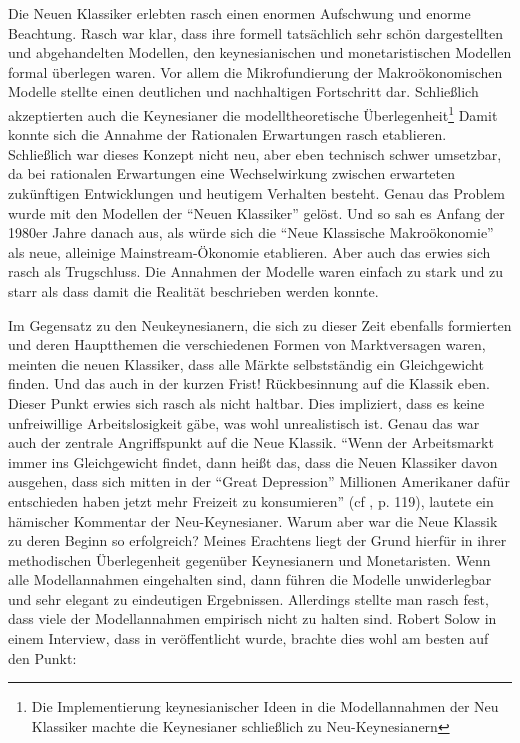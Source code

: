 Die Neuen Klassiker erlebten rasch einen enormen Aufschwung und enorme Beachtung. Rasch war klar, dass ihre formell tatsächlich sehr schön dargestellten und abgehandelten Modellen, den keynesianischen und monetaristischen Modellen formal überlegen waren.
Vor allem die Mikrofundierung der Makroökonomischen Modelle stellte einen deutlichen und nachhaltigen Fortschritt dar. Schließlich akzeptierten auch die Keynesianer die modelltheoretische Überlegenheit\footnote{Die Implementierung keynesianischer Ideen in die Modellannahmen der Neu Klassiker machte die Keynesianer schließlich zu Neu-Keynesianern}
Damit konnte sich die Annahme der Rationalen Erwartungen rasch etablieren. Schließlich war dieses Konzept nicht neu, aber eben technisch schwer umsetzbar, da bei rationalen Erwartungen eine Wechselwirkung zwischen erwarteten zukünftigen Entwicklungen und heutigem Verhalten besteht. Genau das Problem wurde mit den Modellen der "`Neuen Klassiker"' gelöst. Und so sah es Anfang der 1980er Jahre danach aus, als würde sich die "`Neue Klassische Makroökonomie"' als neue, alleinige Mainstream-Ökonomie etablieren. Aber auch das erwies sich rasch als Trugschluss. Die Annahmen der Modelle waren einfach zu stark und zu starr als dass damit die Realität beschrieben werden konnte. 
		
Im Gegensatz zu den Neukeynesianern, die sich zu dieser Zeit ebenfalls formierten und deren Hauptthemen die verschiedenen Formen von Marktversagen waren, meinten die neuen Klassiker, dass alle Märkte selbstständig ein Gleichgewicht finden. Und das auch in der kurzen Frist! Rückbesinnung auf die Klassik eben. Dieser Punkt erwies sich rasch als nicht haltbar. Dies impliziert, dass es keine unfreiwillige Arbeitslosigkeit gäbe, was wohl unrealistisch ist. Genau das war auch der zentrale Angriffspunkt auf die Neue Klassik. "`Wenn der Arbeitsmarkt immer ins Gleichgewicht findet, dann heißt das, dass die Neuen Klassiker davon ausgehen, dass sich mitten in der "`Great Depression"' Millionen Amerikaner dafür entschieden haben jetzt mehr Freizeit zu konsumieren"' (cf \cite{Stiglitz1987}, p. 119), lautete ein hämischer Kommentar der Neu-Keynesianer. 
Warum aber war die Neue Klassik zu deren Beginn so erfolgreich? Meines Erachtens liegt der Grund hierfür in ihrer methodischen Überlegenheit gegenüber Keynesianern und Monetaristen. Wenn alle Modellannahmen eingehalten sind, dann führen die Modelle unwiderlegbar und sehr elegant zu eindeutigen Ergebnissen. Allerdings stellte man rasch fest, dass viele der Modellannahmen empirisch nicht zu halten sind. Robert Solow in einem Interview, dass in \textcite[S. 146]{Klamer1984} veröffentlicht wurde, brachte dies wohl am besten auf den Punkt:

